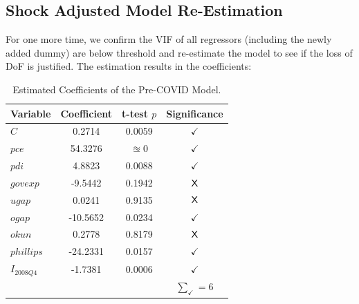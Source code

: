 \subsection{Shock Adjusted Model Re-Estimation}\label{subsec:shock_adjusted_reestimation}
For one more time, we confirm the VIF of all regressors (including the newly added dummy) are below threshold and re-estimate the model to see if the loss of DoF is justified.
The estimation results in the coefficients:
\begin{table}[H]
    \centering
    \begin{tabular}{lccc}
        \toprule
        \textbf{Variable} & \textbf{Coefficient} & \textbf{t-test $p$} & \textbf{Significance} \\
        \midrule
        $C$ & 0.2714 & 0.0059 & $\checkmark$ \\ 
        $pce$ & 54.3276 & $\approxeq 0$ & $\checkmark$ \\
        $pdi$ & 4.8823 & 0.0088 & $\checkmark$ \\
        $govexp$ & -9.5442 & 0.1942 & $\text{\sffamily{X}}$ \\
        $ugap$ & 0.0241 & 0.9135 & $\text{\sffamily{X}}$ \\
        $ogap$ & -10.5652 & 0.0234 & $\checkmark$ \\
        $okun$ &  0.2778 & 0.8179 & $\text{\sffamily{X}}$ \\
        $phillips$ & -24.2331 & 0.0157 & $\checkmark$ \\
        $I_{2008Q4}$ & -1.7381 & 0.0006 & $\checkmark$ \\
        \midrule
        & & & $\sum_\checkmark = 6$ \\
        \bottomrule
    \end{tabular}
    \caption{Estimated Coefficients of the Pre-COVID Model.}
    \label{tab:shockadj_estimated_coefficients}
\end{table}

